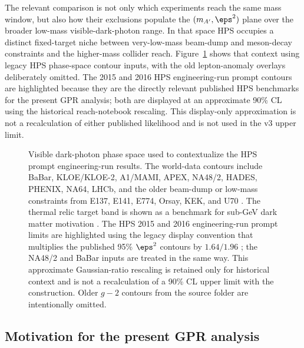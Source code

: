 The relevant comparison is not only which experiments reach the same mass window, but
also how their exclusions populate the $(m_{A^\prime},\eps^2)$ plane over the broader
low-mass visible-dark-photon range. In that space HPS occupies a
distinct fixed-target niche between very-low-mass beam-dump and meson-decay constraints
and the higher-mass collider reach. Figure~\ref{fig:hps-engineering-phase-space}
shows that context using legacy HPS phase-space contour inputs, with the old
lepton-anomaly overlays deliberately omitted. The 2015 and 2016 HPS engineering-run
prompt contours are highlighted because they are the directly relevant published HPS
benchmarks for the present GPR analysis; both are displayed at an approximate 90\% CL
using the historical reach-notebook rescaling. This display-only approximation is not a
recalculation of either published likelihood and is not used in the v3 upper limit.

\begin{figure}[H]
\centering
{}
\caption{Visible dark-photon phase space used to contextualize the HPS prompt
engineering-run results. The world-data contours include BaBar, KLOE/KLOE-2, A1/MAMI,
APEX, NA48/2, HADES, PHENIX, NA64, LHCb, and the older beam-dump or low-mass
constraints from E137, E141, E774, Orsay, KEK, and U70
\cite{BaBarDarkPhoton2014,KLOE2013,KLOE22015,A1MAMI2014,APEX2011,
NA48DarkPhoton2015,HADESDarkPhoton2014,PHENIXDarkPhoton2015,NA64DarkPhoton2018,
NA64X17Visible2021,LHCbDarkPhoton2020,E137BeamDump1988,E141BeamDump1987,
E774BeamDump1991,OrsayBeamDump1989,KEKBeamDump1986,U70DarkPhoton2014}. The thermal
relic target band is shown as a benchmark for sub-GeV dark matter motivation
\cite{EssigEtAl2011}. The HPS 2015 and 2016 engineering-run prompt limits are
highlighted using the legacy display convention that multiplies the published 95\%
$\eps^2$ contours by $1.64/1.96$ \cite{HPS2015DarkPhoton,HPS2016PromptLong}; the
NA48/2 and BaBar inputs are treated in the same way. This approximate Gaussian-ratio
rescaling is retained only for historical context and is not a recalculation of a
90\% CL upper limit with the \CLs{} construction. Older $g-2$ contours from the source
folder are intentionally omitted.}
\label{fig:hps-engineering-phase-space}
\end{figure}

\subsection{Motivation for the present GPR analysis}

